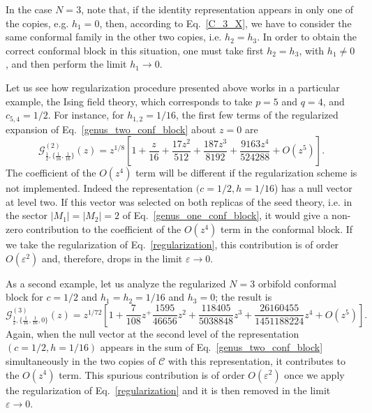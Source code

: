 \documentclass[a4paper,11pt]{article}
\begin{document}
In the case $N=3$, note that, if the identity representation appears in only one of the copies, 
e.g. $h_1=0$, then, according to Eq.~\eqref{C_3_X},  we have to consider the same conformal family in the 
other two copies, i.e. $h_2=h_3$.  In order to obtain the correct conformal block in this situation,
one must take first $h_2=h_3$, with $h_1\neq 0$, and then perform the limit $h_1\to 0$. 

Let us see how regularization procedure presented above works in a particular example, the Ising field 
theory, which corresponds to take $p=5$ and $q=4$, and $c_{5, 4}=1/2$. For instance, for $h_{1, 2}=1/16$, 
the first few terms of the regularized expansion of Eq.~\eqref{genus_two_conf_block} about $z=0$ are 
\begin{equation}
 \mathcal{G}_{\frac{1}{2}, \{\frac{1}{16}, \frac{1}{16}\}}^{(2)}(z)=z^{1/8}
 \left[1+\frac{z}{16}+\frac{17z^2}{512}+\frac{187z^3}{8192}+\frac{9163z^4}{524288}+O(z^5)\right].
\end{equation}
The coefficient of the $O(z^4)$ term will be different if the regularization scheme is not implemented.
Indeed the representation $(c=1/2, h=1/16$) has a null vector at level two. If this vector was selected on both
replicas of the seed theory, i.e. in the sector $|M_1|=|M_2|=2$ of Eq.~\eqref{genus_one_conf_block}, it 
would give a non-zero contribution to the coefficient of the $O(z^4)$ term in the conformal block. 
If we take the regularization of Eq.~\eqref{regularization}, this contribution is of order $O(\varepsilon^2)$
and, therefore, drops in the limit $\varepsilon\to 0$.

As a second example, let us analyze the regularized $N=3$ orbifold conformal block for $c=1/2$ and $h_1=h_2=1/16$
and $h_3=0$; the result is 
\begin{equation}
 \mathcal{G}_{\frac{1}{2}, \{\frac{1}{16}, \frac{1}{16}, 0\}}^{(3)}(z)=
 z^{1/72}\left[1+\frac{7}{108}z^+\frac{1595}{46656}z^2+
 \frac{118405}{5038848}z^3+\frac{26160455}{1451188224}z^4+O(z^5)\right].
\end{equation}
Again, when the null vector at the second level 
of the representation $(c=1/2, h=1/16)$ appears in the sum of Eq.~\eqref{genus_two_conf_block} 
simultaneously in the two copies of $\mathcal{C}$ with this representation, 
it contributes to the $O(z^4)$ term. This spurious contribution is of order $O(\varepsilon^2)$ 
once we apply the regularization of Eq.~\eqref{regularization} and it is then removed in the
limit $\varepsilon\to0$.
\end{document}
